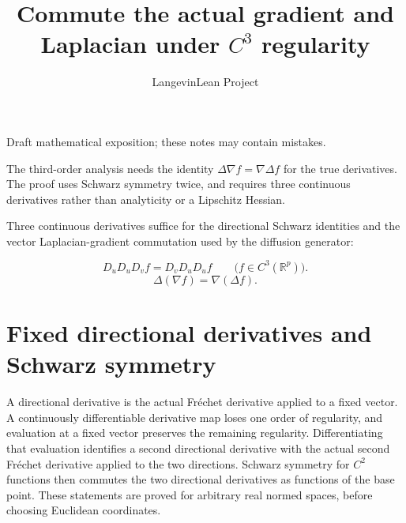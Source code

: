 \documentclass[11pt,a4paper]{article}
\title{\texorpdfstring{Commute the actual gradient and Laplacian under \(C^{3}\) regularity}{Commute the actual gradient and Laplacian under C³ regularity}}
\author{LangevinLean Project}
\date{}
\begin{document}
\maketitle
Draft mathematical exposition; these notes may contain mistakes.


The third-order analysis needs the identity \(\Delta \nabla f=\nabla \Delta f\) for the true derivatives. The proof uses Schwarz symmetry twice, and requires three continuous derivatives rather than analyticity or a Lipschitz Hessian.



Three continuous derivatives suffice for the directional Schwarz identities and the vector Laplacian-gradient commutation used by the diffusion generator:


\[D_uD_uD_vf=D_vD_uD_uf\qquad\bigl(f\in C^3(\mathbb R^p)\bigr).\]
\[\Delta(\nabla f)=\nabla(\Delta f).\]
\section{\texorpdfstring{Fixed directional derivatives and Schwarz symmetry}{Fixed directional derivatives and Schwarz symmetry}}


A directional derivative is the actual Fréchet derivative applied to a fixed vector. A continuously differentiable derivative map loses one order of regularity, and evaluation at a fixed vector preserves the remaining regularity. Differentiating that evaluation identifies a second directional derivative with the actual second Fréchet derivative applied to the two directions. Schwarz symmetry for \(C^{2}\) functions then commutes the two directional derivatives as functions of the base point. These statements are proved for arbitrary real normed spaces, before choosing Euclidean coordinates.
\end{document}
